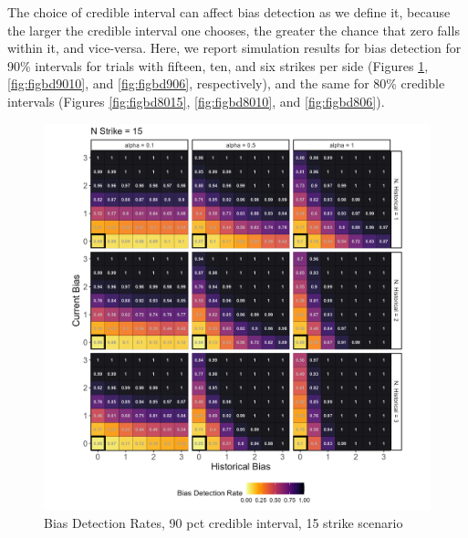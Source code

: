 \documentclass[12pt]{article}
\begin{document}
The choice of credible interval can affect bias detection as we define it, because the larger the credible interval one chooses, the greater the chance that zero falls within it, and vice-versa. Here, we report simulation results for bias detection for 90\% intervals for trials with fifteen, ten, and six strikes per side (Figures \ref{fig:figbd9015}, \ref{fig:figbd9010}, and \ref{fig:figbd906}, respectively), and the same for 80\% credible intervals (Figures \ref{fig:figbd8015}, \ref{fig:figbd8010}, and \ref{fig:figbd806}).

\begin{figure}

{\centering \includegraphics[width=0.95\linewidth]{../figures/pp15_90CI} 

}

\caption{Bias Detection Rates, 90 pct credible interval, 15 strike scenario}\label{fig:figbd9015}
\end{figure}
\end{document}
